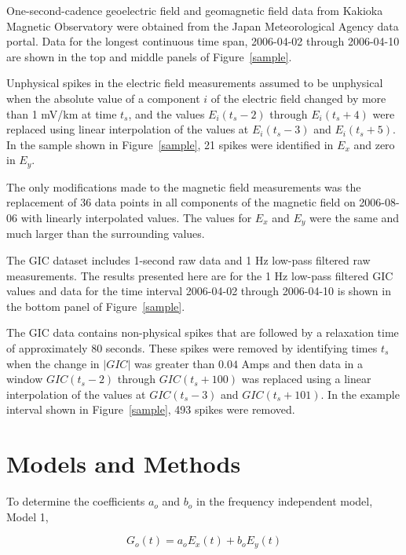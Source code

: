 \documentclass[draft,linenumbers]{agujournal2018}
\begin{document}
One-second-cadence geoelectric field and geomagnetic field data from Kakioka Magnetic Observatory were obtained from the Japan Meteorological Agency data portal. Data for the longest continuous time span, 2006-04-02 through 2006-04-10 are shown in the top and middle panels of Figure~\ref{sample}.

Unphysical spikes in the electric field measurements assumed to be unphysical when the absolute value of a component $i$ of the electric field changed by more than 1 mV/km at time $t_s$, and the values $E_i(t_s-2)$ through $E_i(t_s+4)$ were replaced using linear interpolation of the values at $E_i(t_s-3)$ and $E_i(t_s + 5)$. In the sample shown in Figure~\ref{sample}, 21 spikes were identified in $E_x$ and zero in $E_y$.

The only modifications made to the magnetic field measurements was the replacement of 36 data points in all components of the magnetic field on 2006-08-06 with linearly interpolated values. The values for $E_x$ and $E_y$ were the same and much larger than the surrounding values.

The GIC dataset includes 1-second raw data and 1 Hz low-pass filtered raw measurements.  The results presented here are for the 1 Hz low-pass filtered GIC values and data for the time interval 2006-04-02 through 2006-04-10 is shown in the bottom panel of Figure~\ref{sample}.

The GIC data contains non-physical spikes that are followed by a relaxation time of approximately 80 seconds. These spikes were removed by identifying times $t_s$ when the change in $|GIC|$ was greater than $0.04$ Amps and then data in a window $GIC(t_s-2)$ through $GIC(t_s+100)$ was replaced using a linear interpolation of the values at $GIC(t_s-3)$ and $GIC(t_s + 101)$. In the example interval shown in Figure~\ref{sample}, 493 spikes were removed.

\section{Models and Methods}

To determine the coefficients $a_o$ and $b_o$ in the frequency independent model, Model 1,

\begin{linenomath*}
\begin{equation}
G_o(t) = a_oE_x(t) + b_oE_y(t)
\label{model1}
\end{equation}
\end{linenomath*}
\end{document}
